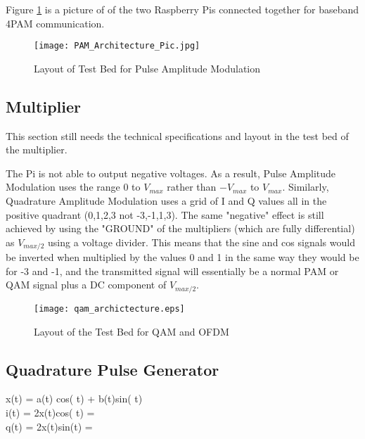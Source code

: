 \documentclass[../main.tex]{subfiles}
\begin{document}
Figure \ref{fig_PAM Architecture} is a picture of of the two Raspberry Pis connected together for baseband 4PAM communication.\\

\begin{figure}[ht]
	\centering
	\texttt{[image: PAM\_Architecture\_Pic.jpg]}
	\caption{Layout of Test Bed for Pulse Amplitude Modulation}
	\label{fig_PAM Architecture}
\end{figure}

\subsection{Multiplier} \label{sec_Multiplier}

This section still needs the technical specifications and layout in the test bed of the multiplier.


The Pi is not able to output negative voltages.
As a result, Pulse Amplitude Modulation uses the range $0$ to $V_{max}$ rather than $-V_{max}$ to $V_{max}$.
Similarly, Quadrature Amplitude Modulation uses a grid of I and Q values all in the positive quadrant (0,1,2,3 not -3,-1,1,3).
The same "negative" effect is still achieved by using the "GROUND" of the multipliers (which are fully differential)
as $V_{max/2}$ using a voltage divider.
This means that the sine and cos signals would be inverted when multiplied by the values 0 and 1 in the same way they would be for -3 and -1, and the transmitted signal will essentially be a normal PAM or QAM signal plus a DC component of $V_{max/2}$.

\begin{figure}[ht]
	\centering
	\texttt{[image: qam\_archictecture.eps]}
	\caption{Layout of the Test Bed for QAM and OFDM}
	\label{fig_QAM Layout}
\end{figure}

\subsection{Quadrature Pulse Generator}

x(t) = a(t) cos( t) + b(t)sin( t)\\
i(t) = 2x(t)cos( t) = \\
q(t) = 2x(t)sin(t) = 
\end{document}
